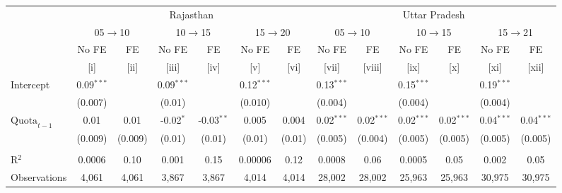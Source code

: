 
\begingroup
\centering
\scriptsize
\begin{adjustbox}{max width=\linewidth}
   \begin{threeparttable}[b]
      \begin{tabular}{lcccccccccccc}
         \toprule
          & \multicolumn{6}{c}{Rajasthan} & \multicolumn{6}{c}{Uttar Pradesh} \\ 
          & \multicolumn{2}{c}{05$\rightarrow$10} & \multicolumn{2}{c}{10$\rightarrow$15} & \multicolumn{2}{c}{15$\rightarrow$20} & \multicolumn{2}{c}{05$\rightarrow$10} & \multicolumn{2}{c}{10$\rightarrow$15} & \multicolumn{2}{c}{15$\rightarrow$21} \\ 
                               & No FE        & FE            & No FE        & FE            & No FE        & FE            & No FE        & FE            & No FE        & FE            & No FE        & FE \\   
                               & [i]          & [ii]          & [iii]        & [iv]          & [v]          & [vi]          & [vii]        & [viii]        & [ix]         & [x]           & [xi]         & [xii]\\  
         \midrule 
         Intercept             & 0.09$^{***}$ &               & 0.09$^{***}$ &               & 0.12$^{***}$ &               & 0.13$^{***}$ &               & 0.15$^{***}$ &               & 0.19$^{***}$ &   \\   
                               & (0.007)      &               & (0.01)       &               & (0.010)      &               & (0.004)      &               & (0.004)      &               & (0.004)      &   \\   
         $\text{Quota}_{t-1}$  & 0.01         & 0.01          & -0.02$^{*}$  & -0.03$^{**}$  & 0.005        & 0.004         & 0.02$^{***}$ & 0.02$^{***}$  & 0.02$^{***}$ & 0.02$^{***}$  & 0.04$^{***}$ & 0.04$^{***}$\\   
                               & (0.009)      & (0.009)       & (0.01)       & (0.01)        & (0.01)       & (0.01)        & (0.005)      & (0.004)       & (0.005)      & (0.005)       & (0.005)      & (0.005)\\   
          \\
         R$^2$                 & 0.0006       & 0.10          & 0.001        & 0.15          & 0.00006      & 0.12          & 0.0008       & 0.06          & 0.0005       & 0.05          & 0.002        & 0.05\\  
         Observations          & 4,061        & 4,061         & 3,867        & 3,867         & 4,014        & 4,014         & 28,002       & 28,002        & 25,963       & 25,963        & 30,975       & 30,975\\  

\end{tabular}
\end{threeparttable}
\end{adjustbox}

